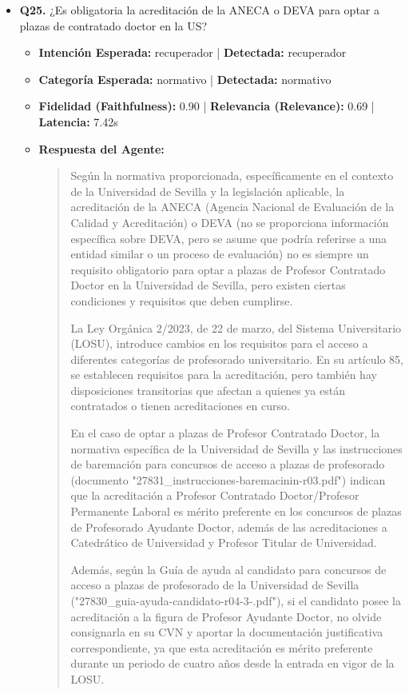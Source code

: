 \documentclass[12pt,a4paper,oneside]{report}
\begin{document}
\begin{itemize}
  
\item \textbf{Q25.} ¿Es obligatoria la acreditación de la ANECA o DEVA para optar a plazas de contratado doctor en la US? \\
        \begin{itemize}
          \item \textbf{Intención Esperada:} recuperador | \textbf{Detectada:} recuperador
          \item \textbf{Categoría Esperada:} normativo | \textbf{Detectada:} normativo
          \item \textbf{Fidelidad (Faithfulness):} 0.90 | \textbf{Relevancia (Relevance):} 0.69 | \textbf{Latencia:} 7.42s
          \item \textbf{{Respuesta del Agente:}} \\
                \begin{quote}
Según la normativa proporcionada, específicamente en el contexto de la Universidad de Sevilla y la legislación aplicable, la acreditación de la ANECA (Agencia Nacional de Evaluación de la Calidad y Acreditación) o DEVA (no se proporciona información específica sobre DEVA, pero se asume que podría referirse a una entidad similar o un proceso de evaluación) no es siempre un requisito obligatorio para optar a plazas de Profesor Contratado Doctor en la Universidad de Sevilla, pero existen ciertas condiciones y requisitos que deben cumplirse.

La Ley Orgánica 2/2023, de 22 de marzo, del Sistema Universitario (LOSU), introduce cambios en los requisitos para el acceso a diferentes categorías de profesorado universitario. En su artículo 85, se establecen requisitos para la acreditación, pero también hay disposiciones transitorias que afectan a quienes ya están contratados o tienen acreditaciones en curso.

En el caso de optar a plazas de Profesor Contratado Doctor, la normativa específica de la Universidad de Sevilla y las instrucciones de baremación para concursos de acceso a plazas de profesorado (documento "27831\_instrucciones-baremacinin-r03.pdf") indican que la acreditación a Profesor Contratado Doctor/Profesor Permanente Laboral es mérito preferente en los concursos de plazas de Profesorado Ayudante Doctor, además de las acreditaciones a Catedrático de Universidad y Profesor Titular de Universidad.

Además, según la Guía de ayuda al candidato para concursos de acceso a plazas de profesorado de la Universidad de Sevilla ("27830\_guia-ayuda-candidato-r04-3-.pdf"), si el candidato posee la acreditación a la figura de Profesor Ayudante Doctor, no olvide consignarla en su CVN y aportar la documentación justificativa correspondiente, ya que esta acreditación es mérito preferente durante un periodo de cuatro años desde la entrada en vigor de la LOSU.


\end{quote}
\end{itemize}
\end{itemize}
\end{document}
